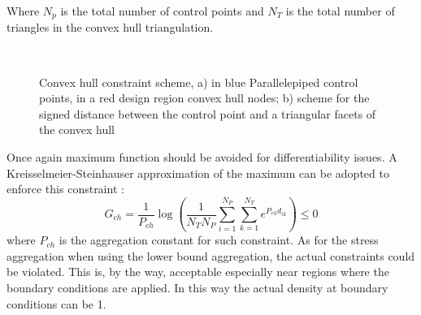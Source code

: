 Where $N_p$ is the total number of control points and $N_T$ is the total number of triangles in the convex hull triangulation. 
  \begin{figure}[!ht]
  \centering
      \\
      \caption{Convex hull constraint scheme, a) in blue Parallelepiped control points, in a red design region convex hull nodes; b) scheme for the signed distance between the control point and a triangular facets of the convex hull}%
      \label{fig:3.34}%
  \end{figure}
     Once again maximum function should be avoided for differentiability issues. 
     A Kreisselmeier-Steinhauser approximation \cite{kreisselmeier1980systematic} of the maximum can be adopted to enforce this constraint :
     \begin{equation}
     \label{eq.CHconstr}
     G_{ch}=\frac{1}{P_{ch}}\log{\left(\frac{1}{N_TN_P}\sum\limits_{i=1}^{N_P}\sum\limits_{k=1}^{N_T}e^{P_{ch}d_{ik} }\right)}\leq 0
     \end{equation}
  where $P_{ch}$ is the aggregation constant for  such constraint.
  As for the stress aggregation when using the lower bound aggregation, the actual constraints could be violated. This is, by the way, acceptable especially near regions where the boundary conditions are applied. In this way the actual density at boundary conditions can be 1. 
